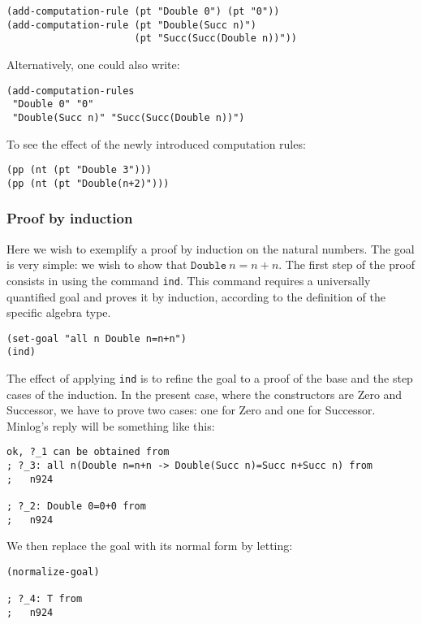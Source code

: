\documentclass[12pt]{amsart}
\newcommand{\mi}{Minlog}
\begin{document}
\begin{verbatim}
(add-computation-rule (pt "Double 0") (pt "0"))
(add-computation-rule (pt "Double(Succ n)")
                      (pt "Succ(Succ(Double n))"))
\end{verbatim}

Alternatively, one could also write:
\begin{verbatim}
(add-computation-rules
 "Double 0" "0"
 "Double(Succ n)" "Succ(Succ(Double n))")
\end{verbatim}

To see the effect of the newly introduced computation rules:
\begin{verbatim}
(pp (nt (pt "Double 3")))
(pp (nt (pt "Double(n+2)")))
\end{verbatim}


\subsubsection{Proof by induction}
Here we wish to exemplify a proof by induction on the natural numbers.
The goal is very simple: we wish to show that $\mathtt{Double}\ n=n+n$.
The first step of the proof consists in using the command
\texttt{ind}.  This command requires a universally quantified goal and
proves it by induction, according to the definition of the specific
algebra type.
\begin{verbatim}
(set-goal "all n Double n=n+n")
(ind)
\end{verbatim}

The effect of applying \texttt{ind} is to refine the goal to a proof
of the base and the step cases of the induction.  In the present case,
where the constructors are Zero and Successor, we have to prove two
cases: one for Zero and one for Successor.  \mi's reply will be
something like this:
\begin{verbatim}
ok, ?_1 can be obtained from
; ?_3: all n(Double n=n+n -> Double(Succ n)=Succ n+Succ n) from
;   n924

; ?_2: Double 0=0+0 from
;   n924
\end{verbatim}

We then replace the goal with its normal form by letting:
\begin{verbatim}
(normalize-goal)

; ?_4: T from
;   n924
\end{verbatim}
\end{document}
